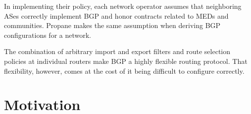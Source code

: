 \documentclass{sig-alternate-10pt}
\newcommand{\sysname}{{\small \sf Propane}\xspace}
\begin{document}
In implementing their policy, each network operator assumes that
neighboring ASes correctly implement BGP and honor contracts related
to MEDs and communities. \sysname makes the same assumption when
deriving BGP configurations for a network.

The combination of arbitrary import and export filters and route selection policies at individual routers make BGP a highly flexible routing protocol. That flexibility, however, comes at the cost of it being difficult to configure correctly.




%
%
%
%

\section{Motivation}
\label{sec:motivation}
\end{document}
